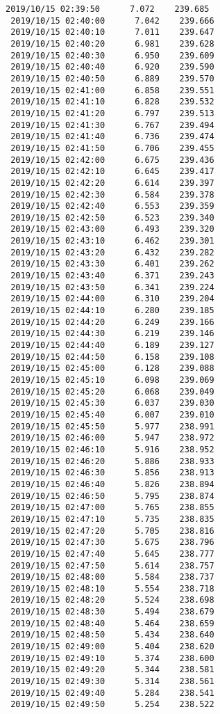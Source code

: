 \documentclass[11pt]{article}
\begin{document}
\begin{Verbatim}[commandchars=\\\{\}]
 2019/10/15 02:39:50      7.072    239.685
 2019/10/15 02:40:00      7.042    239.666
 2019/10/15 02:40:10      7.011    239.647
 2019/10/15 02:40:20      6.981    239.628
 2019/10/15 02:40:30      6.950    239.609
 2019/10/15 02:40:40      6.920    239.590
 2019/10/15 02:40:50      6.889    239.570
 2019/10/15 02:41:00      6.858    239.551
 2019/10/15 02:41:10      6.828    239.532
 2019/10/15 02:41:20      6.797    239.513
 2019/10/15 02:41:30      6.767    239.494
 2019/10/15 02:41:40      6.736    239.474
 2019/10/15 02:41:50      6.706    239.455
 2019/10/15 02:42:00      6.675    239.436
 2019/10/15 02:42:10      6.645    239.417
 2019/10/15 02:42:20      6.614    239.397
 2019/10/15 02:42:30      6.584    239.378
 2019/10/15 02:42:40      6.553    239.359
 2019/10/15 02:42:50      6.523    239.340
 2019/10/15 02:43:00      6.493    239.320
 2019/10/15 02:43:10      6.462    239.301
 2019/10/15 02:43:20      6.432    239.282
 2019/10/15 02:43:30      6.401    239.262
 2019/10/15 02:43:40      6.371    239.243
 2019/10/15 02:43:50      6.341    239.224
 2019/10/15 02:44:00      6.310    239.204
 2019/10/15 02:44:10      6.280    239.185
 2019/10/15 02:44:20      6.249    239.166
 2019/10/15 02:44:30      6.219    239.146
 2019/10/15 02:44:40      6.189    239.127
 2019/10/15 02:44:50      6.158    239.108
 2019/10/15 02:45:00      6.128    239.088
 2019/10/15 02:45:10      6.098    239.069
 2019/10/15 02:45:20      6.068    239.049
 2019/10/15 02:45:30      6.037    239.030
 2019/10/15 02:45:40      6.007    239.010
 2019/10/15 02:45:50      5.977    238.991
 2019/10/15 02:46:00      5.947    238.972
 2019/10/15 02:46:10      5.916    238.952
 2019/10/15 02:46:20      5.886    238.933
 2019/10/15 02:46:30      5.856    238.913
 2019/10/15 02:46:40      5.826    238.894
 2019/10/15 02:46:50      5.795    238.874
 2019/10/15 02:47:00      5.765    238.855
 2019/10/15 02:47:10      5.735    238.835
 2019/10/15 02:47:20      5.705    238.816
 2019/10/15 02:47:30      5.675    238.796
 2019/10/15 02:47:40      5.645    238.777
 2019/10/15 02:47:50      5.614    238.757
 2019/10/15 02:48:00      5.584    238.737
 2019/10/15 02:48:10      5.554    238.718
 2019/10/15 02:48:20      5.524    238.698
 2019/10/15 02:48:30      5.494    238.679
 2019/10/15 02:48:40      5.464    238.659
 2019/10/15 02:48:50      5.434    238.640
 2019/10/15 02:49:00      5.404    238.620
 2019/10/15 02:49:10      5.374    238.600
 2019/10/15 02:49:20      5.344    238.581
 2019/10/15 02:49:30      5.314    238.561
 2019/10/15 02:49:40      5.284    238.541
 2019/10/15 02:49:50      5.254    238.522

\end{Verbatim}
\end{document}
